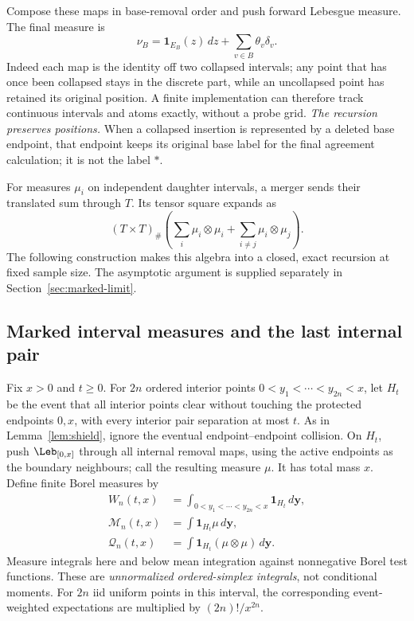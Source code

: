 \documentclass[11pt,letterpaper]{article}
\newcommand{\ind}{\mathbf 1}\newcommand{\Exp}{\operatorname{Exp}}
\begin{document}
Compose these maps in base-removal order and push forward Lebesgue measure.
The final measure is
\begin{equation}\label{eq:final-measure}
 \nu_B=\ind_{E_B}(z)\,dz+\sum_{v\in B}\theta_v\delta_v.
\end{equation}
Indeed each map is the identity off two collapsed intervals; any point that
has once been collapsed stays in the discrete part, while an uncollapsed
point has retained its original position. A finite implementation can
therefore track continuous intervals and atoms exactly, without a probe grid.
\emph{The recursion preserves positions.} When a collapsed insertion is
represented by a deleted base endpoint, that endpoint keeps its original
base label for the final agreement calculation; it is not the label $*$.

For measures $\mu_i$ on independent daughter intervals, a merger sends their
translated sum through $T$. Its tensor square expands as
\begin{equation}\label{eq:tensor}
 (T\times T)_\#\left(
 \sum_i\mu_i\otimes\mu_i+
 \sum_{i\ne j}\mu_i\otimes\mu_j\right).
\end{equation}
The following construction makes this algebra into a closed, exact
recursion at fixed sample size. The asymptotic argument is supplied
separately in Section~\ref{sec:marked-limit}.

\subsection{Marked interval measures and the last internal pair}
\label{sec:finite-recursion}

Fix $x>0$ and $t\ge0$. For $2n$ ordered interior points
$0<y_1<\cdots<y_{2n}<x$, let $H_t$ be the event that all interior points
clear without touching the protected endpoints $0,x$, with every interior
pair separation at most $t$. As in Lemma~\ref{lem:shield}, ignore the
eventual endpoint--endpoint collision. On $H_t$, push $\Leb_{[0,x]}$
through all internal removal maps, using the active endpoints as the
boundary neighbours; call the resulting measure $\mu$. It has total mass
$x$. Define finite Borel measures by
\begin{align}
 W_n(t,x)&=\int_{0<y_1<\cdots<y_{2n}<x}\ind_{H_t}\,d\mathbf y,
 \label{eq:marked-definition}\\
 \mathcal M_n(t,x)&=\int\ind_{H_t}\mu\,d\mathbf y,\nonumber\\
 \mathcal Q_n(t,x)&=\int\ind_{H_t}(\mu\otimes\mu)\,d\mathbf y.
 \nonumber
\end{align}
Measure integrals here and below mean integration against nonnegative
Borel test functions. These are \emph{unnormalized ordered-simplex
integrals}, not conditional moments. For $2n$ iid uniform points in this
interval, the corresponding event-weighted expectations are multiplied
by $(2n)!/x^{2n}$.
\end{document}
